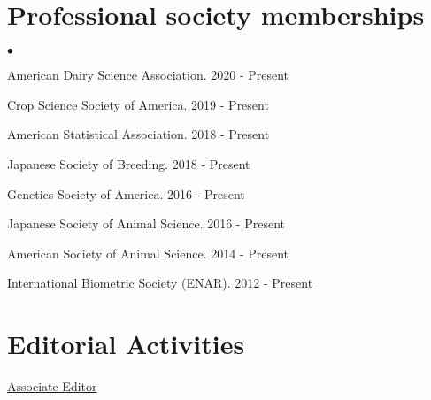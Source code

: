 \documentclass[margin,line,10pt]{res}
\newenvironment{list2}{
  \begin{list}{$\bullet$}{%
      \setlength{\itemsep}{0in}
      \setlength{\parsep}{0in} \setlength{\parskip}{0in}
      \setlength{\topsep}{0in} \setlength{\partopsep}{0in} 
      \setlength{\leftmargin}{0.2in}}}{\end{list}}
\begin{document}
\begin{resume}
\section{\sc Professional society memberships}
\begin{list2}
  \item American Dairy Science Association. 2020 - Present
    \vspace{0.3cm}
  \item Crop Science Society of America. 2019 - Present
    \vspace{0.3cm}
  \item American Statistical Association. 2018 - Present
    \vspace{0.3cm}
  \item  Japanese Society of Breeding. 2018 - Present
  \vspace{0.3cm}
\item  Genetics Society of America. 2016 - Present
  \vspace{0.3cm}
\item  Japanese Society of Animal Science. 2016 - Present
  \vspace{0.3cm}
\item American Society of Animal Science. 2014 - Present
  \vspace{0.3cm}
\item International Biometric Society (ENAR). 2012 - Present
\end{list2}



\vspace{0.5cm}
\section{\sc Editorial Activities}

\underline{Associate Editor}
\vspace{0.2cm}



\end{resume}
\end{document}
